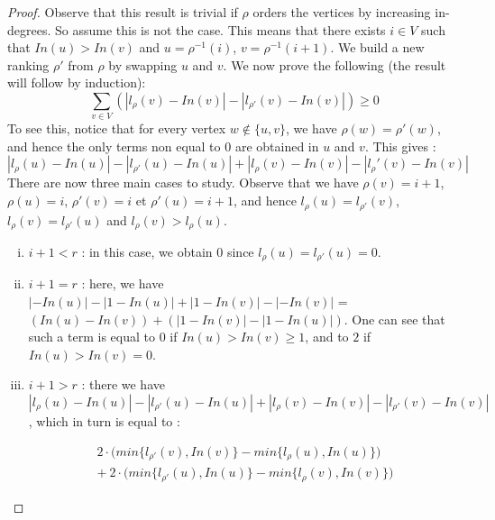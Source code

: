 \documentclass[11pt]{article}
\begin{document}
\begin{proof}
Observe that this result is trivial if $\rho$ orders the vertices by increasing in-degrees. So assume this is not the case. This means that there exists $i \in V$ such that $In(u) > In(v)$ and $u = \rho^{-1}(i)$, $v = \rho^{-1}(i+1)$. We build a new ranking $\rho'$ from $\rho$ by swapping $u$ and $v$. We now prove the following (the result will follow by induction): 
$$\displaystyle\sum_{v \in V} ( |l_\rho(v) - In(v) | - |l_{\rho'}(v) - In(v) |) \geqslant 0$$
To see this, notice that for every vertex $w \notin \{u,v\}$, we have $\rho(w) = \rho'(w)$, and hence the only terms non equal to $0$ are obtained in $u$ and $v$. This gives :
$$|l_{\rho}(u) - In(u) | - |l_{\rho'}(u) - In(u) | + |l_\rho(v) - In(v) | - |l_\rho'(v) - In(v) |$$
There are now three main cases to study. Observe that we have $\rho(v) = i + 1$, $\rho(u) = i$, $\rho'(v) = i$ et $\rho'(u) = i + 1$, and hence $l_\rho(u) = l_{\rho'}(v)$, $l_\rho(v) = l_{\rho'}(u)$ and $l_\rho(v) > l_\rho(u)$. 

\begin{enumerate}[(i)]
	\item $i + 1 < r$ : in this case, we obtain $0$ since $l_\rho(u) = l_{\rho'}(u) = 0$.
	\item $i + 1 = r$ : here, we have $ |-In(u)| - |1 - In(u)| + |1 - In(v)| - |-In(v)|$ = $(In(u) - In(v)) + (|1 - In(v)| - |1 - In(u)|)$. One can see that such a term is equal to $0$ if $In(u) > In(v) \geqslant 1$, and to $2$ if $In(u) > In(v) = 0$.
	\item $i + 1 > r$ : there we have $|l_\rho(u) - In(u)| - |l_{\rho'}(u) - In(u)| + |l_\rho(v) - In(v)| - |l_{\rho'}(v) - In(v)|$, which in turn is equal to :

\begin{eqnarray*}
	2\cdot \Big(min\big\{l_{\rho'}(v), In(v)\big\} - min\big\{l_\rho(u),In(u)\big\}\Big) \\ 
	+\ 2\cdot \Big(min\big\{l_{\rho'}(u),In(u)\big\} - min\big\{l_\rho(v),In(v)\big\}\Big)
\end{eqnarray*}


\end{enumerate}
\end{proof}
\end{document}

